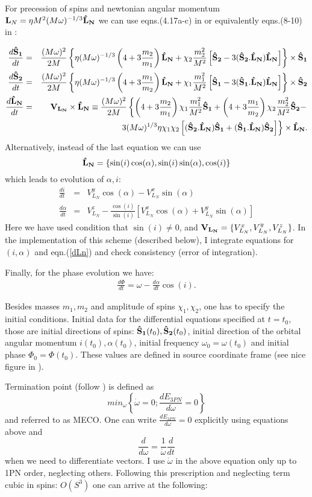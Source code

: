 \documentclass[11pt]{report}
\def\bea{\begin{eqnarray}}
\def\ena{\end{eqnarray}}
\def\bSo{{\bf \hat{S}_1}}
\def\bSt{{\bf \hat{S}_2}}
\def\bL{{\bf \hat{L}_{N}}}
\begin{document}
For precession of spins and newtonian angular momentum 
${\bf L}_N = \eta M^2(M\omega)^{-1/3}\bL$
we can use eqns.(4.17a-c) in \cite{Kidder} or equivalently
eqns.(8-10) in \cite{BCPV}:

\bea
\frac{d\bSo}{dt} &=& \frac{(M\omega)^2}{2M}\left\{ \eta (M\omega)^{-1/3}
\left(4+3\frac{m_2}{m_1}\right)\bL + \chi_2\frac{m_2^2}{M^2}\left[
\bSt - 3(\bSt.\bL)\bL\right]\right\}\times \bSo \\
\frac{d\bSt}{dt} &=& \frac{(M\omega)^2}{2M}\left\{ \eta (M\omega)^{-1/3}
\left(4+3\frac{m_1}{m_2}\right)\bL + \chi_1\frac{m_1^2}{M^2}\left[
\bSo - 3(\bSo.\bL)\bL\right]\right\}\times \bSt\\
\frac{d\bL}{dt} &=& {\bf V_{L_N} }\times\bL \equiv \frac{(M\omega)^2}{2M}
\left\{ \left(4 + 3\frac{m_2}{m_1}\right)\chi_1\frac{m_1^2}{M^2}\bSo +
\left(4 + 3\frac{m_1}{m_2}\right)\chi_2\frac{m_2^2}{M^2}\bSt- \right.
\nonumber\\
&& \left. 3(M\omega)^{1/3}\eta\chi_1\chi_2\left[ (\bSt.\bL)\bSo +
(\bSo.\bL)\bSt \right] \right\}\times\bL.\label{dLn}
\ena
Alternatively, instead of the last equation we can use 
$$
\bL = \{ \sin(i)\cos(\alpha), \sin(i)\sin(\alpha), \cos(i) \}
$$ 
which leads to evolution of $\alpha, i$:
\bea
\frac{di}{dt} &=& V_{L_N}^{y} \cos(\alpha) - V_{L_N}^{x}\sin(\alpha)\\
\frac{d\alpha}{dt} &=& V_{L_N}^z - \frac{\cos(i)}{\sin(i)}\left[ 
V_{L_N}^{x} \cos(\alpha) + V_{L_N}^{y}\sin(\alpha) \right]
\ena
Here we have used condition that $\sin(i) \neq 0$, and ${\bf V_{L_N} } = 
\{ V_{L_N}^{x}, V_{L_N}^{y}, V_{L_N}^{z}\}$.
In the implementation of this scheme (described below), I integrate  
equations for $(i, \alpha)$ and eqn.(\ref{dLn}) and check consistency
(error of integration).

Finally, for the phase evolution we have:
\bea
\frac{d\Phi}{dt} = \omega - \frac{d\alpha}{dt}\cos(i).
\ena 

Besides masses $m_1, m_2$ and amplitude of spins $\chi_1, \chi_2$,
one has to specify the initial conditions. Initial data for the differential 
equations specified at $t=t_0$, those are initial directions of spins:
$\bSo(t_0), \bSt(t_0)$, initial direction of the orbital angular momentum
$i(t_0), \alpha(t_0)$, initial frequency $\omega_0 = \omega(t_0)$ and
initial phase $\Phi_0 = \Phi(t_0)$. 
These values are defined in source coordinate frame (see nice figure in \cite{BCV2}).

Termination point (follow \cite{BCV2}) is defined as
$$
min_{\omega}\left\{ \dot{\omega}= 0; \frac{dE_{3PN}}{d\omega} = 0\right\}
$$
and referred to as MECO.
One can write $\frac{dE_{3PN}}{d\omega} = 0$ explicitly using equations above
and 
$$
\frac{d}{d\omega} = \frac{1}{\dot{\omega}} \frac{d}{dt}
$$
when we need to differentiate vectors. I use $\dot{\omega}$ in the above
equation only up to 1PN order, neglecting others. Following this prescription 
and neglecting term cubic in spins: $O(S^3)$ one can arrive at the following:
\end{document}
